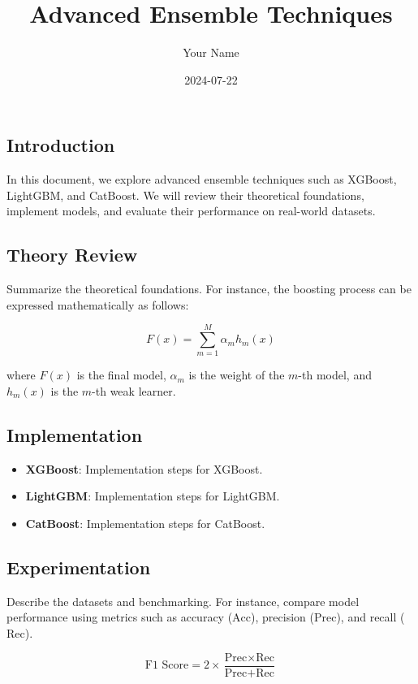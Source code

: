 \documentclass[
]{article}
\title{Advanced Ensemble Techniques}
\author{Your Name}
\date{2024-07-22}
\providecommand{\tightlist}{%
  \setlength{\itemsep}{0pt}\setlength{\parskip}{0pt}}
\begin{document}
\maketitle

\subsection{Introduction}\label{introduction}

In this document, we explore advanced ensemble techniques such as
XGBoost, LightGBM, and CatBoost. We will review their theoretical
foundations, implement models, and evaluate their performance on
real-world datasets.

\subsection{Theory Review}\label{theory-review}

Summarize the theoretical foundations. For instance, the boosting
process can be expressed mathematically as follows:

\[
F(x) = \sum_{m=1}^{M} \alpha_m h_m(x)
\]

where \(F(x)\) is the final model, \(\alpha_m\) is the weight of the
\(m\)-th model, and \(h_m(x)\) is the \(m\)-th weak learner.

\subsection{Implementation}\label{implementation}

\begin{itemize}
\tightlist
\item
  \textbf{XGBoost}: Implementation steps for XGBoost.
\item
  \textbf{LightGBM}: Implementation steps for LightGBM.
\item
  \textbf{CatBoost}: Implementation steps for CatBoost.
\end{itemize}

\subsection{Experimentation}\label{experimentation}

Describe the datasets and benchmarking. For instance, compare model
performance using metrics such as accuracy (\(\text{Acc}\)), precision
(\(\text{Prec}\)), and recall (\(\text{Rec}\)).

\[
\text{F1 Score} = 2 \times \frac{\text{Prec} \times \text{Rec}}{\text{Prec} + \text{Rec}}
\]
\end{document}
